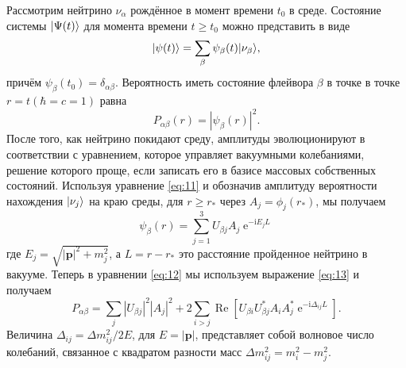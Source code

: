 \documentclass[a4paper,12pt]{article}
\newcommand\Vect[1]{{\boldsymbol{#1}}}
\renewcommand{\Re}{\operatorname{Re}}
\renewcommand{\exp}{\operatorname{e}}
\renewcommand{\imath}{\mathrm{i}}
\DeclarePairedDelimiter\ket{|}{\rangle}
\begin{document}
	Рассмотрим нейтрино \(\nu_{\alpha}\) рождённое в момент времени
	\(t_{0}\) в среде. Состояние системы \(\ket{\Psi(t)}\) для момента времени
	\(t\geqslant t_{0}\) можно представить в виде
	\begin{equation}
		\ket{\psi(t)}=\sum_{\beta}\psi_{\beta}(t)\ket{\nu_{\beta}},
	\end{equation}
	причём \(\psi_{\beta}(t_{0})=\delta_{\alpha\beta}\). Вероятность иметь
	состояние флейвора \(\beta\) в точке в точке \(r=t (\hbar=c=1)\) равна
	\begin{equation}\label{eq:12}
		P_{\alpha\beta}(r)=|\psi_{\beta}(r)|^{2}.
	\end{equation}
	После того, как нейтрино покидают среду, амплитуды
	эволюционируют в соответствии с уравнением, которое
	управляет вакуумными колебаниями, решение которого
	проще, если записать его в базисе массовых собственных
	состояний. Используя уравнение \eqref{eq:11} и обозначив амплитуду вероятности
	нахождения
	\(\ket{\nu_{j}}\) на краю среды, для \(r\geq r_{*}\) через \(A_{j}=\phi_{j}(r_{*})\), мы получаем
	\begin{equation}\label{eq:13}
		\psi_{\beta}(r)=\sum_{j=1}^{3}U_{\beta j}A_{j}\exp^{-\imath E_{j}L}
	\end{equation}
	где \(E_{j}=\sqrt{|\Vect{p}|^{2}+m_{j}^{2}}\), а \(L=r-r_{*}\) это расстояние
	пройденное нейтрино в вакууме. Теперь в
	уравнении \eqref{eq:12} мы используем выражение \eqref{eq:13} и получаем
	\begin{equation}\label{eq:17}
		P_{\alpha\beta}=\sum_{j}|U_{\beta j}|^{2}|A_{j}|^{2}+2\sum_{i>j}\Re[U_{\beta i}U_{\beta j}^{*}A_{i}A_{j}^{*}\exp^{-\imath\Delta_{ij}L}].
	\end{equation}
	Величина \(\Delta_{ij}=\Delta m_{ij}^2/2E\), для \(E=|\Vect{p}|\), представляет собой  волновое число колебаний, связанное с квадратом разности масс
	\(\Delta m_{ij}^{2}=m_{i}^{2}-m_{j}^{2}\).
\end{document}
